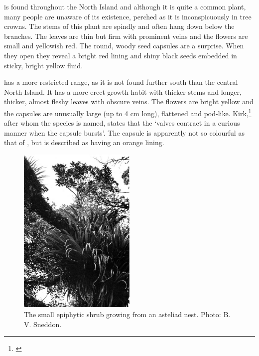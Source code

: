  is found throughout the North Island and although it is quite a common plant, many people are unaware of its existence, perched as it is inconspicuously in tree crowns.
The stems of this plant are spindly and often hang down below the branches.
The leaves are thin but firm with prominent veins and the flowers are small and yellowish red.
The round, woody seed capsules are a surprise.
When they open they reveal a bright red lining and shiny black seeds embedded in sticky, bright yellow fluid.

 has a more restricted range, as it is not found further south than the central North Island.
It has a more erect growth habit with thicker stems and longer, thicker, almost fleshy leaves with obscure veins.
The flowers are bright yellow and the capsules are unusually large (up to 4 cm long), flattened and pod-like.
Kirk,\footnote{\cite{kirk1869botany}} after whom the species is named, states that the `valves contract in a curious manner when the capsule bursts'.
The capsule is apparently not so colourful as that of , but is described as having an orange lining.

\begin{figure}
	\includegraphics[width=0.5\textwidth]{graphics/figure44brachyglottis-kirkii.jpg}
	\centering
	\caption[The small epiphytic shrub \emph{Brachyglottis kirkii}]{The small epiphytic shrub  growing from an asteliad nest.
	Photo: B. V. Sneddon.}%
	\label{fig:44brachyglottis-kirkii}
\end{figure}

